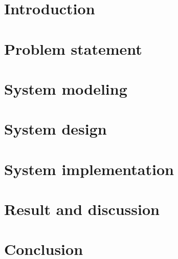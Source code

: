 \documentclass[11pt,a4paper,fleqn]{article}
\begin{document}

\newpage

\tableofcontents
\newpage


\section{Introduction}%
\label{sec:introduction}


\section{Problem statement}%
\label{sec:problem_statement}


\section{System modeling}%
\label{sec:system_modeling}


\section{System design}%
\label{sec:system_design}


\section{System implementation}%
\label{sec:system_implementation}


\section{Result and discussion}%
\label{sec:result_and_discussion}


\section{Conclusion}%
\label{sec:conclusion}




{}

\end{document}

